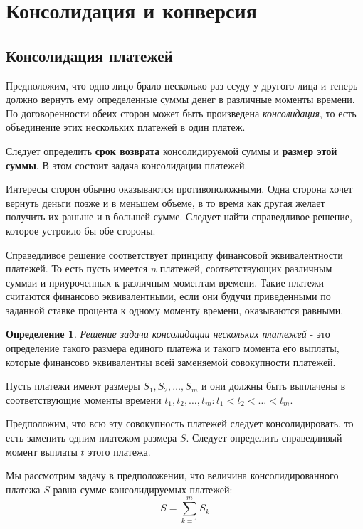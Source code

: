 \documentclass[aps,%
12pt,%
final,%
oneside,
onecolumn,%
musixtex, %
superscriptaddress,%
centertags]{article} %
\theoremstyle{plain}
\theoremstyle{definition}
\newtheorem{definition}{Определение}[subsection]
\theoremstyle{remark}
\begin{document}


\newpage
\section{Консолидация и конверсия}

\subsection{Консолидация платежей}

Предположим, что одно лицо брало несколько раз ссуду у другого лица и теперь должно вернуть ему определенные суммы денег в различные моменты времени. По договоренности обеих сторон может быть произведена \textit{консолидация}, то есть объединение этих нескольких платежей в один платеж. 

Следует определить \textbf{срок возврата} консолидируемой суммы и \textbf{размер этой суммы}. В этом состоит задача консолидации платежей.

Интересы сторон обычно оказываются противоположными. Одна сторона хочет вернуть деньги позже и в меньшем объеме, в то время как другая желает получить их раньше и в большей сумме. Следует найти справедливое решение, которое устроило бы обе стороны.

Справедливое решение соответствует принципу финансовой эквивалентности платежей. То есть пусть имеется $n$ платежей, соответствующих различным суммаи и приуроченных к различным моментам времени. Такие платежи считаются финансово эквивалентными, если они будучи приведенными по заданной ставке процента к одному моменту времени, оказываются равными.

\begin{definition}
	\textit{Решение задачи консолидации нескольких платежей} - это определение такого размера единого платежа и такого момента его выплаты, которые финансово эквивалентны всей заменяемой совокупности платежей. 
\end{definition}

Пусть платежи имеют размеры $S_1, S_2,\ldots, S_m$ и они должны быть выплачены в соответствующие моменты времени $t_1,t_2,\ldots,t_m: t_1 < t_2 < \ldots < t_m$.

Предположим, что всю эту совокупность платежей следует консолидировать, то есть заменить одним платежом размера $S$. Следует определить справедливый момент выплаты $t$ этого платежа.

Мы рассмотрим задачу в предположении, что величина консолидированного платежа $S$ равна сумме консолидируемых платежей:
$$S = \sum\limits_{k=1}^m S_k$$
\end{document}
